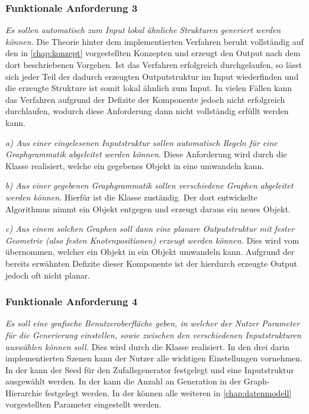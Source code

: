 \subsubsection{Funktionale Anforderung 3}
\textit{Es sollen automatisch zum Input lokal ähnliche Strukturen generiert werden können.} Die Theorie hinter dem implementierten Verfahren beruht
vollständig auf den in \autoref{chap:konzept} vorgestellten Konzepten und erzeugt den Output nach dem dort beschriebenen Vorgehen. Ist das Verfahren
erfolgreich durchgelaufen, so lässt sich jeder Teil der dadurch erzeugten Outputstruktur im Input wiederfinden und die erzeugte Strukture ist somit
lokal ähnlich zum Input. In vielen Fällen kann das Verfahren aufgrund der Defizite der  Komponente jedoch nicht erfolgreich durchlaufen,
wodurch diese Anforderung dann nicht vollständig erfüllt werden kann.

\textit{a) Aus einer eingelesenen Inputstruktur sollen automatisch Regeln für eine Graphgrammatik abgeleitet werden können.} Diese Anforderung wird
durch die Klasse  realisiert, welche ein gegebenes  Objekt in eine  umwandeln kann.

\textit{b) Aus einer gegebenen Graphgrammatik sollen verschiedene Graphen abgeleitet werden können.} Hierfür ist die  Klasse zuständig.
Der dort entwickelte Algorithmus nimmt ein  Objekt entgegen und erzeugt daraus ein neues  Objekt.

\textit{c) Aus einem solchen Graphen soll dann eine planare Outputstruktur mit fester Geometrie (also festen Knotenpositionen) erzeugt werden können.}
Dies wird vom  übernommen, welcher ein  Objekt in ein  Objekt umwandeln kann. Aufgrund der bereits
erwähnten Defizite dieser Komponente ist der hierdurch erzeugte Output jedoch oft nicht planar.

\subsubsection{Funktionale Anforderung 4}
\textit{Es soll eine grafische Benutzeroberfläche geben, in welcher der Nutzer Parameter für die Generierung einstellen, sowie zwischen
den verschiedenen Inputstrukturen auswählen können soll.} Dies wird durch die Klasse  realisiert. In den drei darin
implementierten Szenen kann der Nutzer alle wichtigen Einstellungen vornehmen. In der  kann der Seed für den Zufallsgenerator festgelegt
und eine Inputstruktur ausgewählt werden. In der  kann die Anzahl an Generation in der Graph-Hierarchie festgelegt werden. In der
 können alle weiteren in \autoref{chap:datenmodell} vorgestellten Parameter eingestellt werden.

